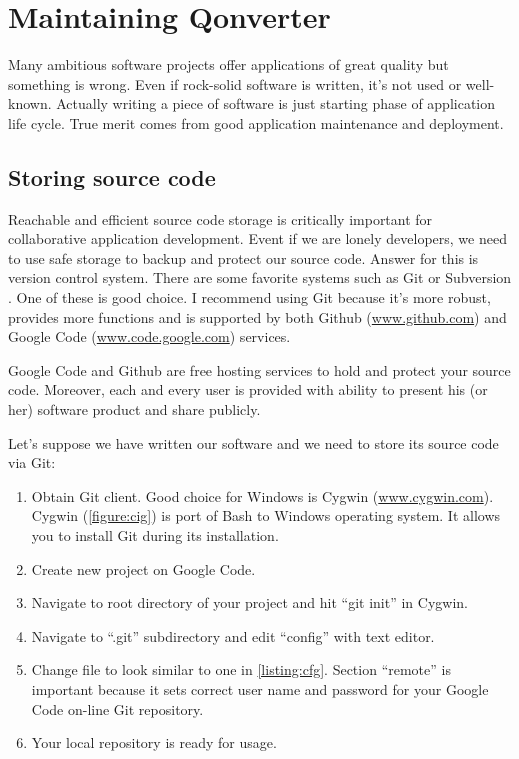 \chapter{Maintaining Qonverter}
Many ambitious software projects offer applications of great quality but something is wrong. Even if rock-solid software is written, it's not used or well-known. Actually writing a piece of software is just starting phase of application life cycle. True merit comes from good application maintenance and deployment.

\section{Storing source code}
Reachable and efficient source code storage is critically important for collaborative application development. Event if we are lonely developers, we need to use safe storage to backup and protect our source code. Answer for this is version control system. There are some favorite systems such as Git \citep{various:git} or Subversion \citep{various:svn}. One of these is good choice. I recommend using Git because it's more robust, provides more functions and is supported by both Github (\href{http://www.github.com}{www.github.com}) and Google Code (\href{http://www.code.google.com}{www.code.google.com}) services.

Google Code and Github are free hosting services to hold and protect your source code. Moreover, each and every user is provided with ability to present his (or her) software product and share publicly.

Let's suppose we have written our software and we need to store its source code via Git:
\begin{enumerate}
\item Obtain Git client. Good choice for Windows is Cygwin (\href{http://www.cygwin.com}{www.cygwin.com}). Cygwin (\autoref{figure:cig}) is port of Bash to Windows operating system. It allows you to install Git during its installation.
\item Create new project on Google Code.
\item Navigate to root directory of your project and hit \enquote{git init} in Cygwin.
\item Navigate to \enquote{.git} subdirectory and edit \enquote{config} with text editor.
\item Change file to look similar to one in \autoref{listing:cfg}. Section \enquote{remote} is important because it sets correct user name and password for your Google Code on-line Git repository.
\item Your local repository is ready for usage.
\end{enumerate}


